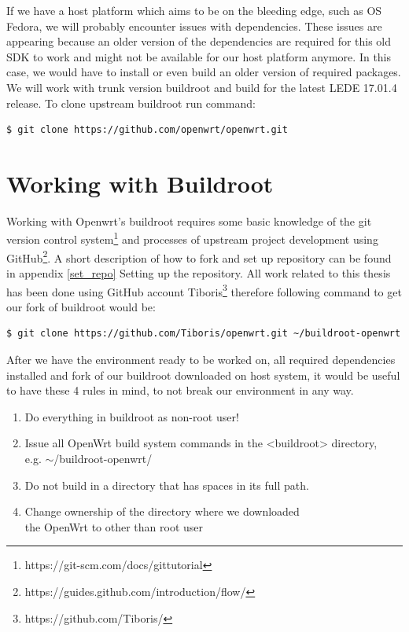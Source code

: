 If we have a host platform which aims to be on the bleeding edge, such as OS Fedora, we will probably encounter issues with dependencies.
These issues are appearing because an older version of the dependencies are required for this old SDK to work and might not be available for our host platform anymore.
In this case, we would have to install or even build an older version of required packages.
We will work with trunk version buildroot and build for the latest LEDE 17.01.4 release.
To clone upstream buildroot run command:
\begin{lstlisting}[columns=fixed,basicstyle=\ttfamily\footnotesize,tabsize=4,backgroundcolor=\color{yellow!10}]
$ git clone https://github.com/openwrt/openwrt.git
\end{lstlisting}

\section{Working with Buildroot}\label{working-with-buildroot}

Working with Openwrt's buildroot requires some basic knowledge of the git version control system\footnote{https://git-scm.com/docs/gittutorial} and processes of upstream project development using GitHub\footnote{https://guides.github.com/introduction/flow/}.
A short description of how to fork and set up repository can be found in appendix \ref{set_repo} Setting up the repository.
All work related to this thesis has been done using GitHub account Tiboris\footnote{https://github.com/Tiboris/} therefore following command to get our fork of buildroot would be:
\begin{lstlisting}[columns=fixed,basicstyle=\ttfamily\footnotesize,tabsize=4,backgroundcolor=\color{yellow!10}]
$ git clone https://github.com/Tiboris/openwrt.git ~/buildroot-openwrt
\end{lstlisting}

After we have the environment ready to be worked on, all required dependencies installed and fork of our buildroot downloaded on host system, it would be useful to have these 4 rules in mind, to not break our environment in any way.
\begin{enumerate}
    \item Do everything in buildroot as non-root user!
    \item Issue all OpenWrt build system commands in the <buildroot> directory, \\e.g. $\sim$/buildroot-openwrt/
    \item Do not build in a directory that has spaces in its full path.
    \item Change ownership of the directory where we downloaded \\the OpenWrt to other than root user
\end{enumerate}




